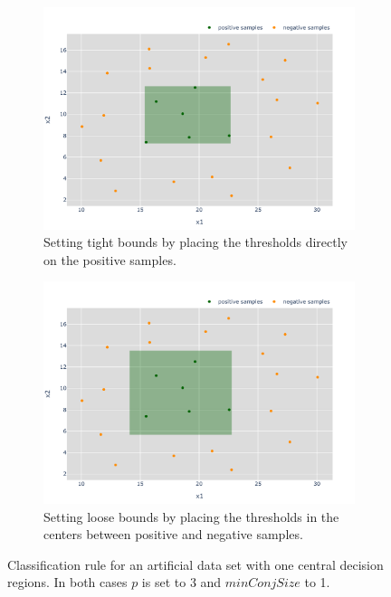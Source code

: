 \begin{figure}
    \centering
    \begin{subfigure}{\textwidth}
        \centering
        \includegraphics[width=0.85\columnwidth]{figures/one_reg_tight.pdf}
        \caption{Setting tight bounds by placing the thresholds directly on the positive samples.}\label{fig:tight}
    \end{subfigure}
    \hfill
    \begin{subfigure}{\textwidth}
        \centering
        \includegraphics[width=0.85\columnwidth]{figures/one_reg_loose.pdf}
        \caption{Setting loose bounds by placing the thresholds in the centers between positive and negative samples.}\label{fig:loose}
    \end{subfigure}
    \caption{Classification rule for an artificial data set with one central decision regions.
        In both cases \(p\) is set to 3 and \(minConjSize\) to 1.}\label{fig:tightLooseThr}
\end{figure}

